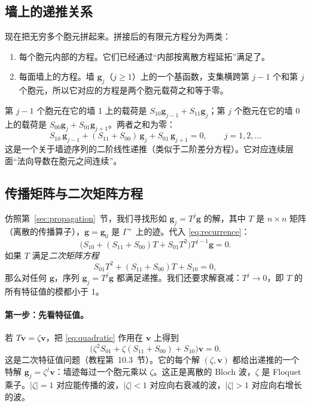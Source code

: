 \documentclass[11pt,a4paper,fontset=fandol]{ctexart}
\begin{document}
\subsection{墙上的递推关系}
\label{sec:recurrence}

现在把无穷多个胞元拼起来。拼接后的有限元方程分为两类：
\begin{enumerate}
\item 每个胞元内部的方程。它们已经通过“内部按离散方程延拓”满足了。
\item 每面墙上的方程。墙 $\bm g_j$（$j\ge1$）上的一个基函数，支集横跨第 $j-1$ 个和第 $j$ 个胞元，所以它对应的方程是两个胞元载荷之和等于零。
\end{enumerate}
第 $j-1$ 个胞元在它的墙 1 上的载荷是 $S_{10}\bm g_{j-1}+S_{11}\bm g_j$；第 $j$ 个胞元在它的墙 0 上的载荷是 $S_{00}\bm g_j+S_{01}\bm g_{j+1}$。两者之和为零：
\begin{equation}
\label{eq:recurrence}
S_{10}\,\bm g_{j-1}+(S_{11}+S_{00})\,\bm g_j+S_{01}\,\bm g_{j+1}=0,\qquad j=1,2,\dots
\end{equation}
这是一个关于墙迹序列的二阶线性递推（类似于二阶差分方程）。它对应连续层面“法向导数在胞元之间连续”。

\subsection{传播矩阵与二次矩阵方程}

仿照第~\ref{sec:propagation}~节，我们寻找形如 $\bm g_j=T^j\bm g$ 的解，其中 $T$ 是 $n\times n$ 矩阵（离散的传播算子），$\bm g=\bm g_0$ 是 $\Gamma^+$ 上的迹。代入 \eqref{eq:recurrence}：
\[
\bigl(S_{10}+(S_{11}+S_{00})T+S_{01}T^2\bigr)T^{j-1}\bm g=0 .
\]
如果 $T$ 满足\emph{二次矩阵方程}
\begin{equation}
\label{eq:quadratic}
S_{01}T^2+(S_{11}+S_{00})T+S_{10}=0 ,
\end{equation}
那么对任何 $\bm g$，序列 $\bm g_j=T^j\bm g$ 都满足递推。我们还要求解衰减：$T^j\to0$，即 $T$ 的所有特征值的模都小于 1。

\paragraph{第一步：先看特征值。} 若 $T\bm v=\zeta\bm v$，把 \eqref{eq:quadratic} 作用在 $\bm v$ 上得到
\begin{equation}
\label{eq:qep-lead}
\bigl(\zeta^2S_{01}+\zeta(S_{11}+S_{00})+S_{10}\bigr)\bm v=0 .
\end{equation}
这是二次特征值问题（教程第~10.3~节）。它的每个解 $(\zeta,\bm v)$ 都给出递推的一个特解 $\bm g_j=\zeta^j\bm v$：墙迹每过一个胞元乘以 $\zeta$。这正是离散的 Bloch 波，$\zeta$ 是 Floquet 乘子。$|\zeta|=1$ 对应能传播的波，$|\zeta|<1$ 对应向右衰减的波，$|\zeta|>1$ 对应向右增长的波。
\end{document}
